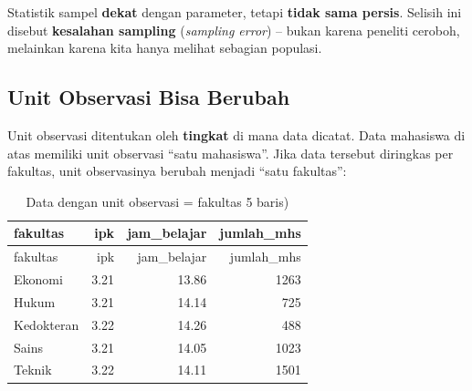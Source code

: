 \documentclass[
  indonesian,
  letterpaper,
]{book}
\newenvironment{Shaded}{\begin{snugshade}}{\end{snugshade}}
\newcommand{\AttributeTok}[1]{\textcolor[rgb]{0.40,0.45,0.13}{#1}}
\newcommand{\DecValTok}[1]{\textcolor[rgb]{0.68,0.00,0.00}{#1}}
\newcommand{\FunctionTok}[1]{\textcolor[rgb]{0.28,0.35,0.67}{#1}}
\newcommand{\NormalTok}[1]{\textcolor[rgb]{0.00,0.23,0.31}{#1}}
\newcommand{\OtherTok}[1]{\textcolor[rgb]{0.00,0.23,0.31}{#1}}
\newcommand{\SpecialCharTok}[1]{\textcolor[rgb]{0.37,0.37,0.37}{#1}}
\newcommand{\StringTok}[1]{\textcolor[rgb]{0.13,0.47,0.30}{#1}}
\begin{document}
Statistik sampel \textbf{dekat} dengan parameter, tetapi \textbf{tidak
sama persis}. Selisih ini disebut \textbf{kesalahan sampling}
(\emph{sampling error}) -- bukan karena peneliti ceroboh, melainkan
karena kita hanya melihat sebagian populasi.

\subsection{Unit Observasi Bisa
Berubah}\label{unit-observasi-bisa-berubah}

Unit observasi ditentukan oleh \textbf{tingkat} di mana data dicatat.
Data mahasiswa di atas memiliki unit observasi ``satu mahasiswa''. Jika
data tersebut diringkas per fakultas, unit observasinya berubah menjadi
``satu fakultas'':

\begin{Shaded}
\end{Shaded}

\begin{longtable}[]{@{}lrrr@{}}
\caption{Data dengan unit observasi = fakultas 5 baris)}\tabularnewline
\toprule\noalign{}
fakultas & ipk & jam\_belajar & jumlah\_mhs \\
\midrule\noalign{}
\endfirsthead
\toprule\noalign{}
fakultas & ipk & jam\_belajar & jumlah\_mhs \\
\midrule\noalign{}
\endhead
\bottomrule\noalign{}
\endlastfoot
Ekonomi & 3.21 & 13.86 & 1263 \\
Hukum & 3.21 & 14.14 & 725 \\
Kedokteran & 3.22 & 14.26 & 488 \\
Sains & 3.21 & 14.05 & 1023 \\
Teknik & 3.22 & 14.11 & 1501 \\
\end{longtable}
\end{document}
